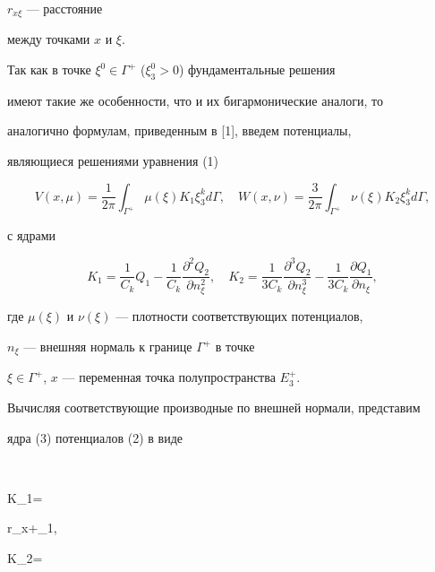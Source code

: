 $r_{x\xi}$ --- расстояние 


между точками $x$ и $\xi$. 


 


Так как в точке $\xi^0\in\Gamma^+$ ($\xi^0_3>0$) фундаментальные решения 


имеют такие же особенности, что и их бигармонические аналоги, то 


аналогично формулам, приведенным в [1], введем потенциалы, 


являющиеся решениями уравнения (1) 


\begin{equation} 


V(x,\mu)=\frac{1}{2\pi}\int_{\Gamma^+}\mu(\xi) K_1


\xi^k_3d\Gamma,\quad 


W(x,\nu)=\frac{3}{2\pi}\int_{\Gamma^+}\nu(\xi) K_2


\xi^k_3d\Gamma ,


\end{equation} 


с ядрами 


\begin{equation} 


K_1=\frac{1}{C_k}Q_1-\frac{1}{C_k}\frac{\partial^2Q_2} 


{\partial n^2_\xi},\quad 


K_2=\frac{1}{3C_k}\frac{\partial^3Q_2}{\partial n^3_\xi}- 


\frac{1}{3C_k}\frac{\partial Q_1}{\partial n_\xi}, 


\end{equation} 


где $\mu(\xi)$ и $\nu(\xi)$ --- плотности соответствующих потенциалов, 


$n_\xi$ --- внешняя нормаль к границе $\Gamma^+$ в точке


$\xi\in\Gamma^+$, $x$ --- переменная точка полупространства $E^+_3$. 


 


Вычисляя соответствующие производные по внешней нормали, представим


ядра (3) потенциалов (2) в виде 


$$ 


K_1= 


{r_{x\xi}}+\varphi_1,\quad 


K_2= 


